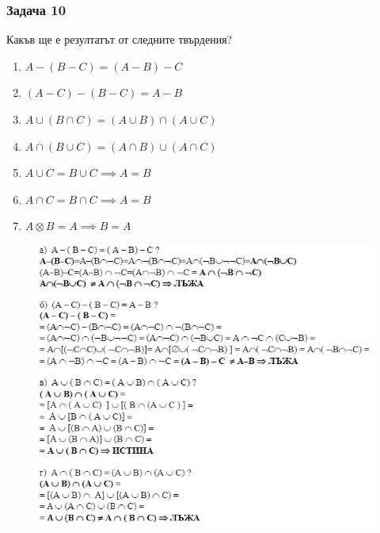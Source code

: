 \documentclass[fleqn, 12pt]{article}
\theoremstyle{definition}
\begin{document}
\subsubsection*{Задача 10}
Какъв ще е резултатът от следните твърдения?
\begin{enumerate}
\item $A - (B - C) = (A - B) - C$
\item $(A-C) - (B-C) = A - B$
\item $A \cup (B \cap C) = (A \cup B) \cap (A \cup C)$
\item $A \cap (B \cup C) = (A \cap B) \cup (A \cap C)$
\item $A\cup C = B \cup C \implies A = B$
\item $A\cap C = B \cap C \implies A = B$
\item $A \otimes B = A \implies B =A$
\end{enumerate}

\begin{figure}[h!]
\includegraphics{Pics/Discrete math/ex3/ex3-task10-1.png}
\end{figure}
\end{document}
